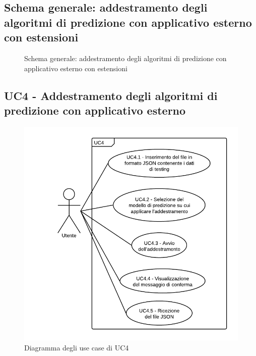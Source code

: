 \subsection{Schema generale: addestramento degli algoritmi di predizione con applicativo esterno con estensioni}
\begin{figure}[H]
\caption{Schema generale: addestramento degli algoritmi di predizione con applicativo esterno con estensioni}
\end{figure}
\subsection{UC4 - Addestramento degli algoritmi di predizione con applicativo esterno}
\begin{figure}[H]
\includegraphics{img/UC4 - Addestramento degli algoritmi di predizione con applicativo esterno.png}
\caption{Diagramma degli use case di UC4}
\end{figure}
